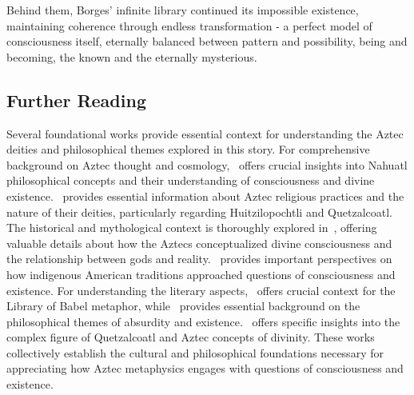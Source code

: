 Behind them, Borges' infinite library continued its impossible existence, maintaining coherence through endless transformation - a perfect model of consciousness itself, eternally balanced between pattern and possibility, being and becoming, the known and the eternally mysterious.

\subsection*{Further Reading}

Several foundational works provide essential context for understanding the Aztec deities and philosophical themes explored in this story. For comprehensive background on Aztec thought and cosmology,~\cite{leon-portilla1963aztec} offers crucial insights into Nahuatl philosophical concepts and their understanding of consciousness and divine existence.~\cite{caso1958aztecs} provides essential information about Aztec religious practices and the nature of their deities, particularly regarding Huitzilopochtli and Quetzalcoatl. The historical and mythological context is thoroughly explored in~\cite{sahagun1950florentine}, offering valuable details about how the Aztecs conceptualized divine consciousness and the relationship between gods and reality.~\cite{brotherston1992book} provides important perspectives on how indigenous American traditions approached questions of consciousness and existence. For understanding the literary aspects,~\cite{borges1964library} offers crucial context for the Library of Babel metaphor, while~\cite{camus1955myth} provides essential background on the philosophical themes of absurdity and existence.~\cite{carrasco1995quetzalcoatl} offers specific insights into the complex figure of Quetzalcoatl and Aztec concepts of divinity. These works collectively establish the cultural and philosophical foundations necessary for appreciating how Aztec metaphysics engages with questions of consciousness and existence.